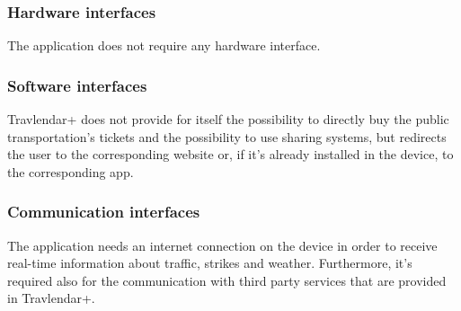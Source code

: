 \documentclass[12pt,titlepage]{article}
\begin{document}
\subsubsection{Hardware interfaces}\label{sec:mod1}
The application does not require any hardware interface. 

\subsubsection{Software interfaces}\label{sec:mod1}
Travlendar+ does not provide for itself the possibility to directly buy the public transportation's tickets and the possibility to use sharing systems, but redirects the user to the corresponding website or, if it's already installed in the device, to the corresponding app.

\subsubsection{Communication interfaces}\label{sec:mod1}
The application needs an internet connection on the device in order to receive real-time information about traffic, strikes and weather. Furthermore, it's required also for the communication with third party services that are provided in Travlendar+. 
\end{document}
